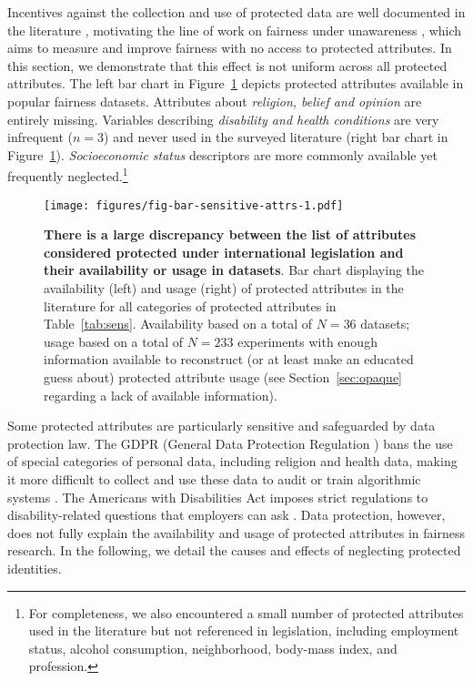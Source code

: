 Incentives against the collection and use of protected data are well documented in the literature \citep{andrus2021what}, motivating the line of work on fairness under unawareness \citep{chen2019fairness,fabris2023measuring}, which aims to measure and improve fairness with no access to protected attributes. In this section, we demonstrate that this effect is not uniform across all protected attributes. The left bar chart in Figure~\ref{fig:sensitive-attributes} depicts protected attributes available in popular fairness datasets. Attributes about \emph{religion, belief and opinion} are entirely missing. Variables describing \emph{disability and health conditions} are very infrequent ($n=3$) and never used in the surveyed literature (right bar chart in Figure~\ref{fig:sensitive-attributes}). \emph{Socioeconomic status} descriptors are more commonly available yet frequently neglected.\footnote{For completeness, we also encountered a small number of protected attributes used in the literature but not referenced in legislation, including employment status, alcohol consumption, neighborhood, body-mass index, and profession.}

\begin{figure}    \texttt{[image: figures/fig-bar-sensitive-attrs-1.pdf]} 
    \caption{\textbf{There is a large discrepancy between the list of attributes considered protected under international legislation and their availability or usage in datasets}. Bar chart displaying the availability (left) and usage (right) of protected attributes in the literature for all categories of protected attributes in Table~\ref{tab:sens}. Availability based on a total of $N = 36$ datasets; usage based on a total of $N = 233$ experiments with enough information available to reconstruct (or at least make an educated guess about) protected attribute usage (see Section~\ref{sec:opaque} regarding a lack of available information).}    \label{fig:sensitive-attributes}\end{figure} 

Some protected attributes are particularly sensitive and safeguarded by data protection law. The GDPR (General Data Protection Regulation \citep{european2016gdpr}) bans the use of special categories of personal data, including religion and health data, making it more difficult to collect and use these data to audit or train algorithmic systems \citep{van2023using}. The Americans with Disabilities Act \citep{unitedstates1990americans} imposes strict regulations to disability-related questions that employers can ask \citep{uscongress1990ada}. Data protection, however, does not fully explain the availability and usage of protected attributes in fairness research. In the following, we detail the causes and effects of neglecting protected identities.

